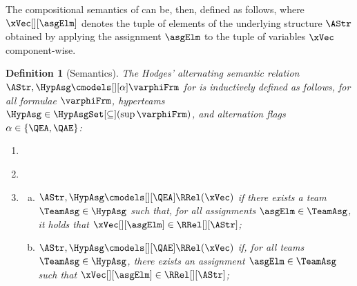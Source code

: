 \documentclass[authoryear]{elsarticle}
\newtheorem{definition}{Definition}
\newcommand{\EmpTeamAsg}{\emptyset}
\newcommand{\EmpHypAsg}{\emptyset}
\begin{document}
The compositional semantics of \ADIF can be, then, defined as follows, where
$\xVec[][\asgElm]$ denotes the tuple of elements of the underlying structure
$\AStr$ obtained by applying the assignment $\asgElm$ to the tuple of variables
$\xVec$ component-wise.

\begin{definition}[\ADIF Semantics]
  \label{def:sem(adif)}
  The \emph{Hodges' alternating semantic relation} ${\AStr, \HypAsg
  \cmodels[][\alpha] \varphiFrm}$ for \ADIF is inductively defined as follows,
  for all \ADIF formulae $\varphiFrm$, hyperteams $\HypAsg \in
  \HypAsgSet[\subseteq](\sup{\varphiFrm})$, and alternation flags $\alpha \in \{
  \QEA, \QAE \}$:
  \begin{enumerate}[1)]
    \item\label{def:sem(adif:fbv)}
    \item\label{def:sem(adif:tbv)}
    \item\label{def:sem(adif:rel)}
      \begin{enumerate}[a)]
        \item\label{def:sem(adif:rel:ea)}
          $\AStr, \HypAsg \cmodels[][\QEA] \RRel(\xVec)$ if there exists a team
          $\TeamAsg \in \HypAsg$ such that, for all assignments $\asgElm \in
          \TeamAsg$, it holds that $\xVec[][\asgElm] \in \RRel[][\AStr]$;
        \item\label{def:sem(adif:rel:ae)}
          $\AStr, \HypAsg \cmodels[][\QAE] \RRel(\xVec)$ if, for all teams
          $\TeamAsg \in \HypAsg$, there exists an assignment $\asgElm \in
          \TeamAsg$ such that $\xVec[][\asgElm] \in \RRel[][\AStr]$;

\end{enumerate}
\end{enumerate}
\end{definition}
\end{document}
